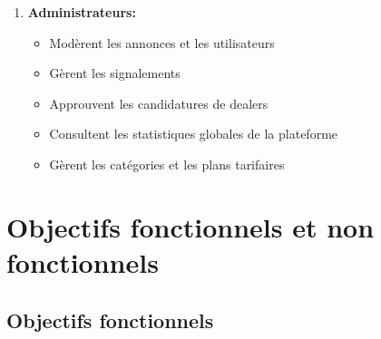 \documentclass[12pt,a4paper]{report}
\begin{document}
\begin{enumerate}
    \item \textbf{Administrateurs:}
    \begin{itemize}
        \item Modèrent les annonces et les utilisateurs
        \item Gèrent les signalements
        \item Approuvent les candidatures de dealers
        \item Consultent les statistiques globales de la plateforme
        \item Gèrent les catégories et les plans tarifaires
    \end{itemize}
\end{enumerate}

\section{Objectifs fonctionnels et non fonctionnels}

\subsection{Objectifs fonctionnels}
\end{document}
